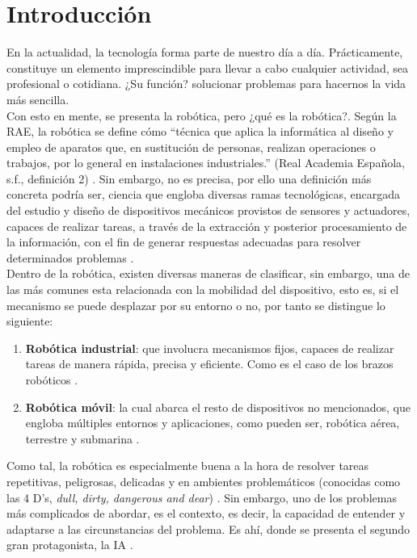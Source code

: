 \chapter{Introducción}
\label{cap:capitulo1}
\setcounter{page}{1}

En la actualidad, la tecnología forma parte de nuestro día a día. Prácticamente, constituye un elemento imprescindible para llevar a cabo cualquier actividad, sea profesional o cotidiana. ¿Su función? solucionar problemas para hacernos la vida más sencilla.\\

Con esto en mente, se presenta la robótica, pero ¿qué es la robótica?. Según la \ac{RAE}, la robótica se define cómo ``técnica que aplica la informática al diseño y empleo de aparatos que, en sustitución de personas, realizan operaciones o trabajos, por lo general en instalaciones industriales.'' (Real Academia Española, s.f., definición 2) \cite{rae-robotica}. Sin embargo, no es precisa, por ello una definición más concreta podría ser, ciencia que engloba diversas ramas tecnológicas, encargada del estudio y diseño de dispositivos mecánicos provistos de sensores y actuadores, capaces de realizar tareas, a través de la extracción y posterior procesamiento de la información, con el fin de generar respuestas adecuadas para resolver determinados problemas \cite{revista-de-robots}.\\

Dentro de la robótica, existen diversas maneras de clasificar, sin embargo, una de las más comunes esta relacionada con la mobilidad del dispositivo, esto es, si el mecanismo se puede desplazar por su entorno o no, por tanto se distingue lo siguiente:

\begin{enumerate}
	\item \textbf{Robótica industrial}: que involucra mecanismos fijos, capaces de realizar tareas de manera rápida, precisa y eficiente. Como es el caso de los brazos robóticos \cite{industrial-robot}.

	\item \textbf{Robótica móvil}: la cual abarca el resto de dispositivos no mencionados, que engloba múltiples entornos y aplicaciones, como pueden ser, robótica aérea, terrestre y submarina \cite{mobile-robot}.
\end{enumerate}

Como tal, la robótica es especialmente buena a la hora de resolver tareas repetitivas, peligrosas, delicadas y en ambientes problemáticos (conocidas como las 4 D's, \emph{dull, dirty, dangerous and dear}) \cite{4-d}. Sin embargo, uno de los problemas más complicados de abordar, es el contexto, es decir, la capacidad de entender y adaptarse a las circunstancias del problema. Es ahí, donde se presenta el segundo gran protagonista, la \ac{IA} \cite{dworakowski2020robots}.\\

